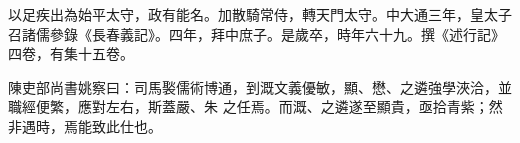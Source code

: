 \begin{pinyinscope}
 以足疾出為始平太守，政有能名。加散騎常侍，轉天門太守。中大通三年，皇太子召諸儒參錄《長春義記》。四年，拜中庶子。是歲卒，時年六十九。撰《述行記》四卷，有集十五卷。



 陳吏部尚書姚察曰：司馬褧儒術博通，到溉文義優敏，顯、懋、之遴強學浹洽，並職經便繁，應對左右，斯蓋嚴、朱
 之任焉。而溉、之遴遂至顯貴，亟拾青紫；然非遇時，焉能致此仕也。



\end{pinyinscope}
